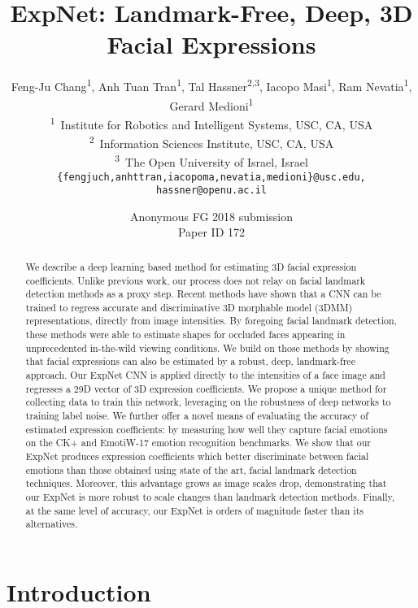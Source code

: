 \documentclass[a4paper, 10pt, conference]{ieeeconf}
\title{\LARGE \bf
ExpNet: Landmark-Free, Deep, 3D Facial Expressions
}
\author{Feng-Ju Chang\textsuperscript{1}, Anh Tuan Tran\textsuperscript{1}, Tal Hassner\textsuperscript{2,3}, Iacopo Masi\textsuperscript{1}, Ram Nevatia\textsuperscript{1}, Gerard Medioni\textsuperscript{1}\\
\textsuperscript{1}~Institute for Robotics and Intelligent Systems, USC, CA, USA\\
\textsuperscript{2}~Information Sciences Institute, USC, CA, USA\\
\textsuperscript{3}~The Open University of Israel, Israel\\
{\tt\small \{fengjuch,anhttran,iacopoma,nevatia,medioni\}@usc.edu, hassner@openu.ac.il}
}
\def\FGPaperID{172}
\begin{document}
\IEEEoverridecommandlockouts{}


\ifFGfinal
\thispagestyle{empty}
\pagestyle{empty}
\else
\author{Anonymous FG 2018 submission\\ Paper ID \FGPaperID \\}
\pagestyle{plain}
\fi
\maketitle

\begin{abstract}
We describe a deep learning based method for estimating 3D facial expression coefficients. Unlike previous work, our process does not relay on facial landmark detection methods as a proxy step. Recent methods have shown that a CNN can be trained to regress accurate and discriminative 3D morphable model (3DMM) representations, directly from image intensities. By foregoing facial landmark detection, these methods were able to estimate shapes for occluded faces appearing in unprecedented in-the-wild viewing conditions. We build on those methods by showing that facial expressions can also be estimated by a robust, deep, landmark-free approach. Our ExpNet CNN is applied directly to the intensities of a face image and regresses a 29D vector of 3D expression coefficients. We propose a unique method for collecting data to train this network, leveraging on the robustness of deep networks to training label noise. We further offer a novel means of evaluating the accuracy of estimated expression coefficients: by measuring how well they capture facial emotions on the CK+ and EmotiW-17 emotion recognition benchmarks. We show that our ExpNet produces expression coefficients which better discriminate between facial emotions than those obtained using state of the art, facial landmark detection techniques. Moreover, this advantage grows as image scales drop, demonstrating that our ExpNet is more robust to scale changes than landmark detection methods. Finally, at the same level of accuracy, our ExpNet is orders of magnitude faster than its alternatives. 
\end{abstract}


\section{Introduction}\label{sec:intro}
\end{document}
